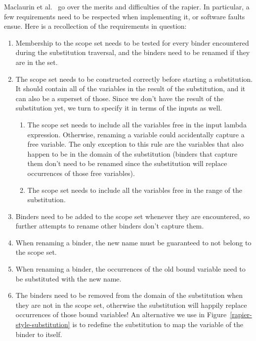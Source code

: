 \documentclass[sigconf, anonymous, review]{acmart}
\begin{document}
Maclaurin et al.~\cite{maclaurin23} go over the merits and difficulties of the rapier. In
particular, a few requirements need to be respected when implementing it, or
software faults ensue. Here is a recollection of the requirements in
question:
\begin{enumerate}
\item Membership to the scope set needs to be tested for every binder encountered
      during the substitution traversal, and the binders need to be renamed if
      they are in the set.
\item The scope set needs to be constructed correctly before starting a substitution.
      It should contain all of the variables in the result of the substitution,
      and it can also be a superset of those. Since we don't have the result of
      the substitution yet, we turn to specify it in terms of the inputs as well.
      \begin{enumerate}
      \item The scope set needs to include all the variables free in the input
            lambda expression. Otherwise, renaming a variable could accidentally
            capture a free variable. The only exception to this rule are the
            variables that also happen to be in the domain of the substitution
            (binders that capture them don't need to be renamed since the substitution
            will replace occurrences of those free variables).
      \item The scope set needs to include all the variables free in the range
            of the substitution.
      \end{enumerate}
\item Binders need to be added to the scope set whenever they are encountered,
      so further attempts to rename other binders don't capture them.
\item When renaming a binder, the new name must be guaranteed to not belong to
      the scope set.
\item When renaming a binder, the occurrences of the old bound variable need to be
      substituted with the new name.
\item The binders need to be removed from the domain of the substitution when
      they are not in the scope set, otherwise the substitution will happily
      replace occurrences of those bound variables! An alternative we use in
      Figure~\ref{rapier-style-substitution} is to redefine the substitution to
      map the variable of the binder to itself.
\end{enumerate}
\end{document}
